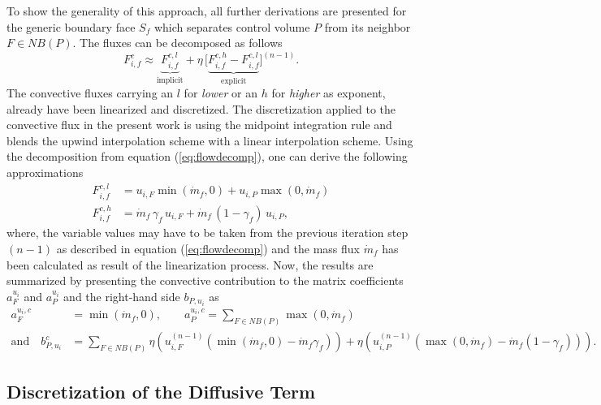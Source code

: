 To show the generality of this approach, all further derivations are presented for the generic boundary face \(S_f\) which separates control volume \(P\) from its neighbor \(F \in NB(P)\). The fluxes can be decomposed as follows
\begin{equation}
  \label{eq:flowdecomp}
  F_{i,f}^c \approx  \underbrace{F_{i,f}^{c,l}}_{\text{implicit}} + \eta \, \bigl[\underbrace{ F_{i,f}^{c,h} - F_{i,f}^{c,l} }_{\text{explicit}}\bigr]^{(n-1)}.
\end{equation}
The convective fluxes carrying an \(l\) for \emph{lower} or an \(h\) for \emph{higher} as exponent, already have been linearized and discretized. The discretization applied to the convective flux in the present work is using the midpoint integration rule and blends the upwind interpolation scheme with a linear interpolation scheme. Using the decomposition from equation (\ref{eq:flowdecomp}), one can derive the following approximations
\begin{align*}
  F_{i,f}^{c,l} &= u_{i,F} \min(\dot{m}_f ,0) + u_{i,P} \max(0,\dot{m}_f) \\
  F_{i,f}^{c,h} &= \dot{m}_f \, \gamma_f \, u_{i,F} +  \dot{m}_f \, (1 - \gamma_f) \, u_{i,P},
\end{align*}
where, the variable values may have to be taken from the previous iteration step \((n-1)\) as described in equation (\ref{eq:flowdecomp}) and the mass flux \(\dot{m}_f\) has been calculated as result of the linearization process. Now, the results are summarized by presenting the convective contribution to the matrix coefficients \(a_{F}^{u_i}\) and \(a_P^{u_i}\) and the right-hand side \(b_{P,u_i}\) as
\begin{align*}
  a_F^{u_i,c} &= \min(\dot{m}_f ,0), \quad \quad a_P^{u_i,c} = \sum_{F \in NB(P)} \max(0,\dot{m}_f) \\[1em]
  \text{and} \quad b_{P,u_i}^c &= \sum_{F \in NB(P)} \eta  \left(u_{i,F}^{(n-1)} \left( \min(\dot{m}_f,0) - \dot{m}_f \gamma_f \right)\right)
  + \eta \left( u_{i,P}^{(n-1)} \left( \max(0,\dot{m}_f) - \dot{m}_f \left(1 - \gamma_f\right) \right)\right).
\end{align*}

\subsection{Discretization of the Diffusive Term}

